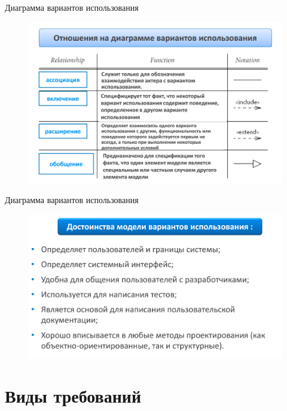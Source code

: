 \documentclass{beamer}
\begin{document}
\begin{frame}[t]{Диаграмма вариантов использования}
\begin{figure}[h]
\centering
\includegraphics[scale=0.45]{images/lec03-pic12.png}
\end{figure}
\end{frame}

\begin{frame}[t]{Диаграмма вариантов использования}
\begin{figure}[h]
\centering
\includegraphics[scale=0.45]{images/lec03-pic13.png}
\end{figure}
\end{frame}

\section{Виды требований}
   
\end{document}
